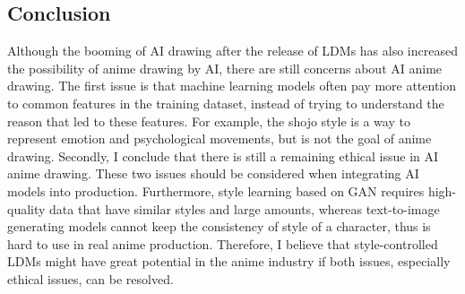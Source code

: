 \subsection*{Conclusion}

Although the booming of AI drawing after the release of LDMs has also increased
the possibility of anime drawing by AI,
there are still concerns about AI anime drawing.
The first issue is that machine learning models often pay more attention to common features
in the training dataset,
instead of trying to understand the reason that led to these features.
For example, the shojo style is a way to represent emotion and psychological movements,
but is not the goal of anime drawing.
Secondly, I conclude that there is still a remaining ethical issue in AI anime drawing.
These two issues should be considered when integrating AI models into production.
Furthermore, style learning based on GAN requires high-quality data that have similar styles and large amounts,
whereas text-to-image generating models cannot keep the consistency of style of a character,
thus is hard to use in real anime production.
Therefore, I believe that style-controlled LDMs might have great potential in the anime industry if 
both issues, especially ethical issues, can be resolved.
